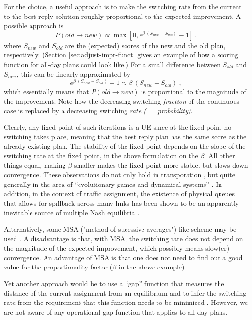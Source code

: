 For the choice, a useful approach is to make the switching rate from
the current to the best reply solution roughly proportional to the
expected improvement. A possible approach is
\begin{equation}
P(old \to new) \propto \max[ 0, e^{\beta \, (S_{new} - S_{old})} - 1]\ .
\end{equation}
where $S_{new}$ and $S_{old}$ are the (expected) scores of the new
and the old plan, respectively. (Section \ref{sec:adjust-impr-funct}
gives an example of how a scoring function for all-day plans could
look like.)  For a small difference between $S_{old}$ and $S_{new}$,
this can be linearly approximated by
\begin{equation}
e^{\beta \, (S_{new} - S_{old})} - 1
\approx\beta \,  (S_{new} - S_{old})\ ,
\end{equation}
which essentially means that $P(old \to new)$ is proportional to the 
magnitude of the improvement.  Note how
the decreasing switching \emph{fraction} of the continuous case is
replaced by a decreasing switching \emph{rate ($=$ probability)}.

Clearly, any fixed point of such iterations is a UE since at the
fixed point no switching takes place, meaning that the best reply plan
has the same score as the already existing plan.  
%
The stability of the fixed point depends on the slope of the switching
rate at the fixed point, in the above formulation on the $\beta$: All
other things equal, making $\beta$ smaller makes the fixed point more
stable, but slows down convergence. 
%
These observations do not only hold in transporation \citep[e.g.,][]{watling-2003},
but quite generally in the area of ``evolutionary
games and dynamical systems'' \citep{HofbSigmBook}. 
%
In addition, in the context of
traffic assignment, the existence of physical queues that allows for 
spillback across many links has been shown to be an apparently inevitable
source of multiple Nash equilibria \citep[][]{daganzo-1998}.

Alternatively, some MSA ("method of sucessive averages")-like scheme
may be used \citep{liu-2007}.  A disadvantage is that, with MSA, the
switching rate does not depend on the magnitude of the expected
improvement, which possibly means slow(er) convergence.  An advantage
of MSA is that one does not need to find out a good value for the
proportionality factor ($\beta$ in the above example).  

Yet another approach would be to use a ``gap'' function that measures the
distance of the current assignment from an equilibrium and to infer
the switching rate from the requirement that this function needs to
be minimized 
\citep{LuMahmassaniZhou2009GapDue,zhang-2008}.
However, we are not aware of any operational gap function that applies to all-day plans.

